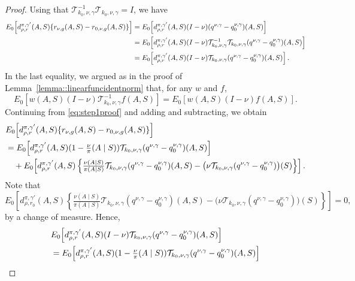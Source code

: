 \documentclass[11pt]{article}
\theoremstyle{plain}
\begin{document}
\begin{proof}
 
Using that
\(\mathcal{T}_{k_0,\nu,\gamma}^{-1}\mathcal{T}_{k_0,\nu,\gamma} = I\), we have
\begin{align}
E_0\!\left[d_{\rho,r}^{\pi,\gamma'}(A,S)\{r_{\nu,g}(A,S) - r_{0,\nu,g}(A,S)\}\right] 
&= E_0\!\left[d_{\rho,r}^{\pi,\gamma'}(A,S)(I - \nu)(q^{\nu,\gamma} - q_0^{\nu,\gamma})(A,S)\right] \notag \\
&= E_0\!\left[d_{\rho,r}^{\pi,\gamma'}(A,S)(I - \nu)\mathcal{T}_{k_0,\nu,\gamma}^{-1}\mathcal{T}_{k_0,\nu,\gamma}(q^{\nu,\gamma} - q_0^{\nu,\gamma})(A,S)\right] \notag \\
&= E_0\!\left[d_{\rho,r}^{\pi,\gamma'}(A,S)(I - \nu)\mathcal{T}_{k_0,\nu,\gamma}(q^{\nu,\gamma} - q_0^{\nu,\gamma})(A,S)\right]. \label{eq:step1proof}
\end{align}
In the last equality, we argued as in the proof of Lemma~\ref{lemma::linearfuncidentnorm} that, for any $w$ and $f$,
\begin{equation*}
E_0\!\left[w(A,S)(I - \nu)\mathcal{T}_{k_0,\nu,\gamma}^{-1}f(A,S)\right] 
= E_0\!\left[w(A,S)(I - \nu)f(A,S)\right]. 
\end{equation*}
Continuing from \eqref{eq:step1proof} and adding and subtracting, we obtain
\begin{align}
& E_0\!\left[d_{\rho,r}^{\pi,\gamma'}(A,S)\{r_{\nu,g}(A,S) - r_{0,\nu,g}(A,S)\}\right] \notag \\
&= E_0\!\left[d_{\rho,r}^{\pi,\gamma'}(A,S)(1 - \tfrac{\nu}{\pi}(A \mid S))\mathcal{T}_{k_0,\nu,\gamma}(q^{\nu,\gamma} - q_0^{\nu,\gamma})(A,S)\right] \notag \\
&\quad + E_0\!\left[d_{\rho,r}^{\pi,\gamma'}(A,S)\left\{\tfrac{\nu(A \mid S)}{\pi(A \mid S)}\mathcal{T}_{k_0,\nu,\gamma}(q^{\nu,\gamma} - q_0^{\nu,\gamma})(A,S) - \bigl(\nu\mathcal{T}_{k_0,\nu,\gamma}(q^{\nu,\gamma} - q_0^{\nu,\gamma})\bigr)(S)\right\}\right]. \label{eq:step3proof}
\end{align}
Note that
\begin{equation*}
E_0\!\left[d_{\rho,r_0}^{\pi,\gamma'}(A,S)\left\{\tfrac{\nu(A \mid S)}{\pi(A \mid S)}\mathcal{T}_{k_0,\nu,\gamma}(q^{\nu,\gamma} - q_0^{\nu,\gamma})(A,S) - \bigl(\nu\mathcal{T}_{k_0,\nu,\gamma}(q^{\nu,\gamma} - q_0^{\nu,\gamma})\bigr)(S)\right\}\right] = 0,
\end{equation*}
by a change of measure. Hence,
\begin{align}
& E_0\!\left[d_{\rho,r}^{\pi,\gamma'}(A,S)(I - \nu)\mathcal{T}_{k_0,\nu,\gamma}(q^{\nu,\gamma} - q_0^{\nu,\gamma})(A,S)\right] \notag \\
&= E_0\!\left[d_{\rho,r}^{\pi,\gamma'}(A,S)(1 - \tfrac{\nu}{\pi}(A \mid S))\mathcal{T}_{k_0,\nu,\gamma}(q^{\nu,\gamma} - q_0^{\nu,\gamma})(A,S)\right] \notag \\

\end{align}
\end{proof}
\end{document}
